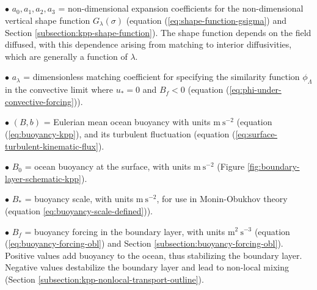 \subsection*{}


\vspace{.1cm}
\begin{trivlist}

\item[$\bullet$] $a_{0}, a_{1}, a_{2}, a_{3}$ = non-dimensional
  expansion coefficients for the non-dimensional vertical shape
  function $G_{\lambda}(\sigma)$ (equation
  (\ref{eq:shape-function-gsigma}) and Section
  \ref{subsection:kpp-shape-function}).  The shape function depends on
  the field diffused, with this dependence arising from matching to
  interior diffusivities, which are generally a function of $\lambda$.

\item[$\bullet$] $a_{\lambda}$ = dimensionless matching coefficient
  for specifying the similarity function $\phi_{\Lambda}$ in the
  convective limit where $u_{*} = 0$ and $B_{f} < 0$ (equation
  (\ref{eq:phi-under-convective-forcing})).

\item[$\bullet$] $(B,b)$ = Eulerian mean ocean buoyancy with units
  $\mbox{m}~\mbox{s}^{-2}$ (equation (\ref{eq:buoyancy-kpp}), and its
  turbulent fluctuation (equation
  (\ref{eq:surface-turbulent-kinematic-flux}).

\item[$\bullet$] $B_{0}$ = ocean buoyancy at the surface, with units
  $\mbox{m}~\mbox{s}^{-2}$ (Figure
  \ref{fig:boundary-layer-schematic-kpp}).

\item[$\bullet$] $B_{*}$ = buoyancy scale, with units
  $\mbox{m}~\mbox{s}^{-2}$, for use in Monin-Obukhov theory (equation
  \ref{eq:buoyancy-scale-defined})).

\item[$\bullet$] $B_{f}$ = buoyancy forcing in the boundary layer,
  with units $\mbox{m}^{2}~\mbox{s}^{-3}$ (equation
  (\ref{eq:buoyancy-forcing-obl}) and Section
  \ref{subsection:buoyancy-forcing-obl}).  Positive values add
  buoyancy to the ocean, thus stabilizing the boundary layer.
  Negative values destabilize the boundary layer and lead to non-local
  mixing (Section \ref{subsection:kpp-nonlocal-transport-outline}).


\end{trivlist}
